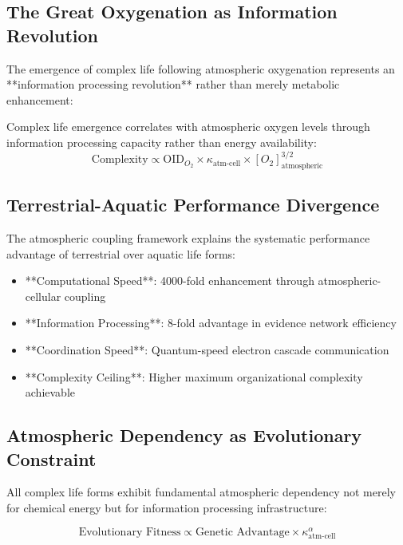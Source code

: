 \documentclass[twocolumn]{article}
\begin{document}
\subsection{The Great Oxygenation as Information Revolution}

The emergence of complex life following atmospheric oxygenation represents an **information processing revolution** rather than merely metabolic enhancement:

\begin{theorem}
Complex life emergence correlates with atmospheric oxygen levels through information processing capacity rather than energy availability:
\begin{equation}
\text{Complexity} \propto \text{OID}_{O_2} \times \kappa_{\text{atm-cell}} \times [O_2]_{\text{atmospheric}}^{3/2}
\end{equation}
\end{theorem}

\subsection{Terrestrial-Aquatic Performance Divergence}

The atmospheric coupling framework explains the systematic performance advantage of terrestrial over aquatic life forms:

\begin{itemize}
\item **Computational Speed**: 4000-fold enhancement through atmospheric-cellular coupling
\item **Information Processing**: 8-fold advantage in evidence network efficiency  
\item **Coordination Speed**: Quantum-speed electron cascade communication
\item **Complexity Ceiling**: Higher maximum organizational complexity achievable
\end{itemize}

\subsection{Atmospheric Dependency as Evolutionary Constraint}

All complex life forms exhibit fundamental atmospheric dependency not merely for chemical energy but for information processing infrastructure:

\begin{equation}
\text{Evolutionary Fitness} \propto \text{Genetic Advantage} \times \kappa_{\text{atm-cell}}^{\alpha}
\end{equation}
\end{document}
